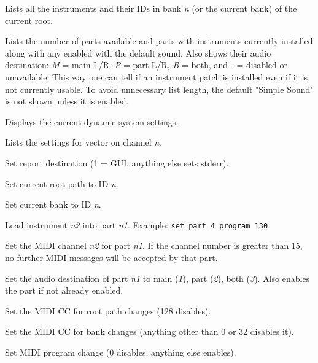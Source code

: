       Lists all the instruments and their IDs in bank \textsl{n}
      (or the current bank) of the current root.

      Lists the number of parts available and parts with instruments
      currently installed along with any enabled with the default sound.
      Also shows their audio destination:
      \textsl{M} = main L/R, \textsl{P} = part L/R, \textsl{B} = both, and
      \textsl{-} = disabled or unavailable.
      This way one can tell if an instrument patch is installed even if it is
      not currently usable.
      To avoid unnecessary list length, the default "Simple Sound" is not shown
      unless it is enabled.

      Displays the current dynamic system settings.

      Lists the settings for vector on channel \textsl{n}.

      Set report destination (1 = GUI, anything else sets stderr).

      Set current root path to ID \textsl{n}.

      Set current bank to ID \textsl{n}.

      Load instrument \textsl{n2} into part \textsl{n1}.
      Example: \texttt{set part 4 program 130}

      Set the MIDI channel \textsl{n2} for part \textsl{n1}.
      If the channel number is greater than 15, no further MIDI
      messages will be accepted by that part.

      Set the audio destination of part \textsl{n1}
      to main (\textsl{1}), part (\textsl{2}), both (\textsl{3}).
      Also enables the part if not already enabled.

      Set the MIDI CC for root path changes (128 disables).

      Set the MIDI CC for bank changes (anything other than 0 or 32
      disables it).

      Set MIDI program change (0 disables, anything else enables).

